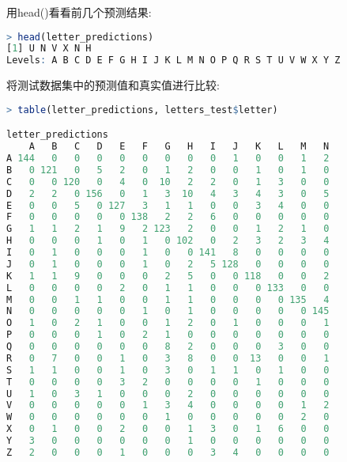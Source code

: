 \documentclass[11pt,a4paper,oneside]{book}
\begin{document}
用head()看看前几个预测结果:
\begin{lstlisting}[language=r]
> head(letter_predictions)
[1] U N V X N H
Levels: A B C D E F G H I J K L M N O P Q R S T U V W X Y Z
\end{lstlisting}

将测试数据集中的预测值和真实值进行比较:
\begin{lstlisting}[language=r]
> table(letter_predictions, letters_test$letter)

letter_predictions   
    A   B   C   D   E   F   G   H   I   J   K   L   M   N
A 144   0   0   0   0   0   0   0   0   1   0   0   1   2
B   0 121   0   5   2   0   1   2   0   0   1   0   1   0
C   0   0 120   0   4   0  10   2   2   0   1   3   0   0
D   2   2   0 156   0   1   3  10   4   3   4   3   0   5
E   0   0   5   0 127   3   1   1   0   0   3   4   0   0
F   0   0   0   0   0 138   2   2   6   0   0   0   0   0
G   1   1   2   1   9   2 123   2   0   0   1   2   1   0
H   0   0   0   1   0   1   0 102   0   2   3   2   3   4
I   0   1   0   0   0   1   0   0 141   8   0   0   0   0
J   0   1   0   0   0   1   0   2   5 128   0   0   0   0
K   1   1   9   0   0   0   2   5   0   0 118   0   0   2
L   0   0   0   0   2   0   1   1   0   0   0 133   0   0
M   0   0   1   1   0   0   1   1   0   0   0   0 135   4
N   0   0   0   0   0   1   0   1   0   0   0   0   0 145
O   1   0   2   1   0   0   1   2   0   1   0   0   0   1
P   0   0   0   1   0   2   1   0   0   0   0   0   0   0
Q   0   0   0   0   0   0   8   2   0   0   0   3   0   0
R   0   7   0   0   1   0   3   8   0   0  13   0   0   1
S   1   1   0   0   1   0   3   0   1   1   0   1   0   0
T   0   0   0   0   3   2   0   0   0   0   1   0   0   0
U   1   0   3   1   0   0   0   2   0   0   0   0   0   0
V   0   0   0   0   0   1   3   4   0   0   0   0   1   2
W   0   0   0   0   0   0   1   0   0   0   0   0   2   0
X   0   1   0   0   2   0   0   1   3   0   1   6   0   0
Y   3   0   0   0   0   0   0   1   0   0   0   0   0   0
Z   2   0   0   0   1   0   0   0   3   4   0   0   0   0


\end{lstlisting}
\end{document}
